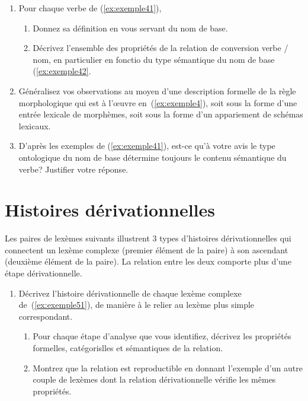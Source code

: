 \begin{enumerate}
\item Pour chaque verbe de (\ref{ex:exemple41}), 
	\begin{enumerate}
	\item Donnez sa  définition en vous servant du nom de base.
	\item Décrivez l'ensemble des propriétés de la relation de conversion  verbe / nom, en particulier en fonctio du type sémantique du nom de base (\ref{ex:exemple42}.
	\end{enumerate}   
\item Généralisez vos observations au moyen d'une description formelle de la règle morphologique qui est à l'œuvre en~(\ref{ex:exemple4}), soit sous la forme d'une entrée lexicale de morphèmes, soit sous la forme d'un appariement de schémas lexicaux.
\item D'après les exemples de (\ref{ex:exemple41}), est-ce qu'à votre avis le type ontologique du nom de base détermine toujours le contenu sémantique du verbe? Justifier votre réponse. 

\end{enumerate}


\section{Histoires dérivationnelles}

Les paires de lexèmes suivants illustrent 3 types d'histoires dérivationnelles qui connectent un lexème complexe  (premier élément de la paire) à son ascendant (deuxième élément de la paire). La relation entre les deux comporte plus d'une étape dérivationnelle. 

\vspace{-.5\baselineskip}
\begin{exe}
\ex \label{ex:exemple51}\begin{xlist}
\ex \cogestionnaireexcinq
\ex  \poulaillerexcinq
\ex \langagierexcinq
\end{xlist}
\end{exe}

\begin{enumerate}
\item \label{it:question-ex5} Décrivez l'histoire dérivationnelle de chaque lexème complexe de~(\ref{ex:exemple51}), de manière à le relier au lexème plus simple correspondant.  
\begin{enumerate}
\item Pour chaque étape d'analyse que vous identifiez, décrivez les propriétés formelles, catégorislles et sémantiques de la relation.
\item Montrez que la relation est reproductible en donnant l'exemple d'un autre couple de lexèmes dont la relation dérivationnelle vérifie les mêmes propriétés.
\end{enumerate}
\end{enumerate}

